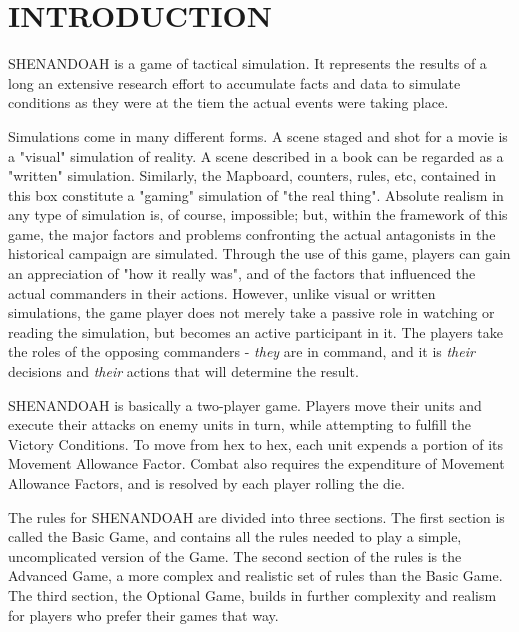 \section{INTRODUCTION}

SHENANDOAH is a game of tactical simulation. It represents the results of a long an extensive research effort to accumulate facts and data to simulate conditions as they were at the tiem the actual events were taking place.

Simulations come in many different forms. A scene staged and shot for a movie is a "visual" simulation of reality. A scene described in a book can be regarded as a "written" simulation. Similarly, the Mapboard, counters, rules, etc, contained in this box constitute a "gaming" simulation of "the real thing". Absolute realism in any type of simulation is, of course, impossible; but, within the framework of this game, the major factors and problems confronting the actual antagonists in the historical campaign are simulated. Through the use of this game, players can gain an appreciation of "how it really was", and of the factors that influenced the actual commanders in their actions. However, unlike visual or written simulations, the game player does not merely take a passive role in watching or reading the simulation, but becomes an active participant in it. The players take the roles of the opposing commanders - \textit{they} are in command, and it is \textit{their} decisions and \textit{their} actions that will determine the result.

SHENANDOAH is basically a two-player game. Players move their units and execute their attacks on enemy units in turn, while attempting to fulfill the Victory Conditions. To move from hex to hex, each unit expends a portion of its Movement Allowance Factor. Combat also requires the expenditure of Movement Allowance Factors, and is resolved by each player rolling the die.

The rules for SHENANDOAH are divided into three sections. The first section is called the Basic Game, and contains all the rules needed to play a simple, uncomplicated version of the Game. The second section of the rules is the Advanced Game, a more complex and realistic set of rules than the Basic Game. The third section, the Optional Game, builds in further complexity and realism for players who prefer their games that way.